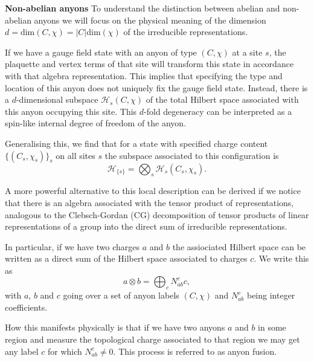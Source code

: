 \documentclass[two column]{article}
\begin{document}
\textbf{Non-abelian anyons} To understand the distinction between abelian and non-abelian anyons we will focus on the physical meaning of the dimension $d = \text{dim}(C, \chi) = |C|\text{dim}(\chi)$ of the irreducible representations.

If we have a gauge field state with an anyon of type $(C, \chi)$ at a site $s$, the plaquette and vertex terms of that site will transform this state in accordance with that algebra representation. This implies that specifying the type and location of this anyon does not uniquely fix the gauge field state. Instead, there is a $d$-dimensional subspace $\mathcal H_s(C,\chi)$ of the total Hilbert space associated with this anyon occupying this site. This $d$-fold degeneracy can be interpreted as a spin-like internal degree of freedom of the anyon.

Generalising this, we find that for a state with specified charge content $\{(C_s, \chi_s)\}_s$ on all sites $s$ the subspace associated to this configuration is
\begin{equation}
	\mathcal{H}_{\{s\}} = \bigotimes_s \mathcal H_s (C_s, \chi_s).
\end{equation}

A more powerful alternative to this local description can be derived if we notice that
there is an algebra associated with the tensor product of representations, analogous to the Clebsch-Gordan (CG) decomposition of tensor products of linear representations of a group into the direct sum of irreducible representations. 

In particular, if we have two charges $a$ and $b$ the assiociated Hilbert space can be written as a direct sum of the Hilbert space associated to charges $c$. We write this as 
\begin{equation}
	a \otimes b = \bigoplus_{c}N^c_{ab} c,\label{eqn:fuse} 
\end{equation}
with $a$, $b$ and $c$ going over a set of anyon labels $(C, \chi)$ and $N_{ab}^c$ being integer coefficients. 



How this manifests physically is that if we have two anyons $a$ and $b$ in some region and measure the topological charge associated to that region we may get any label $c$ for which $N_{ab}^c \neq 0$. This process is referred to as anyon fusion.
\end{document}
